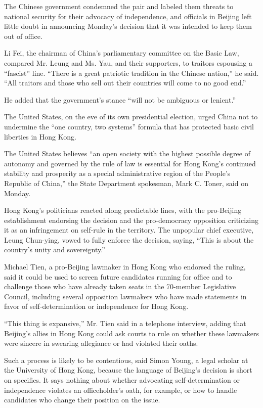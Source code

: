 The Chinese government condemned the pair and labeled them threats to
national security for their advocacy of independence, and officials in
Beijing left little doubt in announcing Monday's decision that it was
intended to keep them out of office.

Li Fei, the chairman of China's parliamentary committee on the Basic
Law, compared Mr. Leung and Ms. Yau, and their supporters, to traitors
espousing a ``fascist'' line. ``There is a great patriotic tradition in
the Chinese nation,'' he said. ``All traitors and those who sell out
their countries will come to no good end.''

He added that the government's stance ``will not be ambiguous or
lenient.''

The United States, on the eve of its own presidential election, urged
China not to undermine the ``one country, two systems'' formula that has
protected basic civil liberties in Hong Kong.

The United States believes ``an open society with the highest possible
degree of autonomy and governed by the rule of law is essential for Hong
Kong's continued stability and prosperity as a special administrative
region of the People's Republic of China,'' the State Department
spokesman, Mark C. Toner, said on Monday.

Hong Kong's politicians reacted along predictable lines, with the
pro-Beijing establishment endorsing the decision and the pro-democracy
opposition criticizing it as an infringement on self-rule in the
territory. The unpopular chief executive, Leung Chun-ying, vowed to
fully enforce the decision, saying, ``This is about the country's unity
and sovereignty.''

Michael Tien, a pro-Beijing lawmaker in Hong Kong who endorsed the
ruling, said it could be used to screen future candidates running for
office and to challenge those who have already taken seats in the
70-member Legislative Council, including several opposition lawmakers
who have made statements in favor of self-determination or independence
for Hong Kong.

``This thing is expansive,'' Mr. Tien said in a telephone interview,
adding that Beijing's allies in Hong Kong could ask courts to rule on
whether these lawmakers were sincere in swearing allegiance or had
violated their oaths.

Such a process is likely to be contentious, said Simon Young, a legal
scholar at the University of Hong Kong, because the language of
Beijing's decision is short on specifics. It says nothing about whether
advocating self-determination or independence violates an officeholder's
oath, for example, or how to handle candidates who change their position
on the issue.

